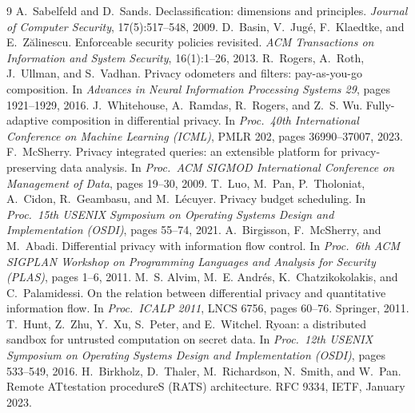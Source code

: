 \documentclass[11pt,a4paper]{article}
\begin{document}
\begin{thebibliography}{9}
 A.~Sabelfeld and D.~Sands. Declassification: dimensions and principles. \emph{Journal
of Computer Security}, 17(5):517--548, 2009.
 D.~Basin, V.~Jug\'e, F.~Klaedtke, and E.~Z\u{a}linescu. Enforceable security
policies revisited. \emph{ACM Transactions on Information and System Security}, 16(1):1--26, 2013.
 R.~Rogers, A.~Roth, J.~Ullman, and S.~Vadhan. Privacy odometers and filters:
pay-as-you-go composition. In \emph{Advances in Neural Information Processing Systems 29}, pages
1921--1929, 2016.
 J.~Whitehouse, A.~Ramdas, R.~Rogers, and Z.~S. Wu. Fully-adaptive composition in
differential privacy. In \emph{Proc.\ 40th International Conference on Machine Learning (ICML)},
PMLR 202, pages 36990--37007, 2023.
 F.~McSherry. Privacy integrated queries: an extensible platform for
privacy-preserving data analysis. In \emph{Proc.\ ACM SIGMOD International Conference on Management
of Data}, pages 19--30, 2009.
 T.~Luo, M.~Pan, P.~Tholoniat, A.~Cidon, R.~Geambasu, and M.~L\'ecuyer. Privacy
budget scheduling. In \emph{Proc.\ 15th USENIX Symposium on Operating Systems Design and
Implementation (OSDI)}, pages 55--74, 2021.
 A.~Birgisson, F.~McSherry, and M.~Abadi. Differential privacy with information flow
control. In \emph{Proc.\ 6th ACM SIGPLAN Workshop on Programming Languages and Analysis for
Security (PLAS)}, pages 1--6, 2011.
 M.~S. Alvim, M.~E. Andr\'es, K.~Chatzikokolakis, and C.~Palamidessi. On the
relation between differential privacy and quantitative information flow. In \emph{Proc.\ ICALP
2011}, LNCS 6756, pages 60--76. Springer, 2011.
 T.~Hunt, Z.~Zhu, Y.~Xu, S.~Peter, and E.~Witchel. Ryoan: a distributed sandbox for
untrusted computation on secret data. In \emph{Proc.\ 12th USENIX Symposium on Operating Systems
Design and Implementation (OSDI)}, pages 533--549, 2016.
 H.~Birkholz, D.~Thaler, M.~Richardson, N.~Smith, and W.~Pan. Remote ATtestation
procedureS (RATS) architecture. RFC 9334, IETF, January 2023.
\end{thebibliography}
\end{document}
